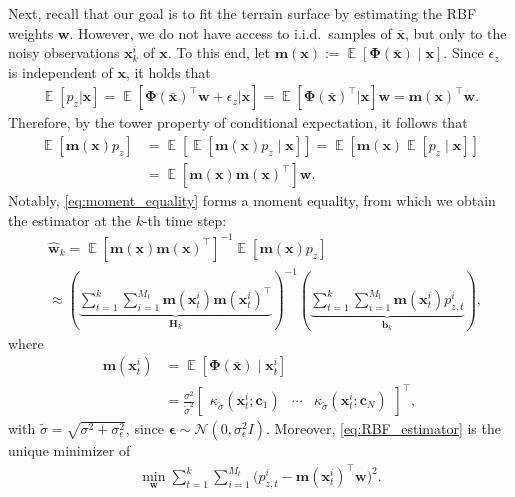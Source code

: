 \documentclass[journal,twoside,web]{ieeecolor}
\DeclareMathOperator*{\mE}{\mathbb{E}}
\begin{document}
Next, recall that our goal is to fit the terrain surface by estimating the RBF weights $\mathbf{w}$. 
However, we do not have access to i.i.d.\ samples of $\bar{\mathbf{x}}$, but only to the noisy observations $\mathbf{x}^i_k$ of $\mathbf{x}$. 
To this end, let $\mathbf{m}(\mathbf{x}):=\mE[\bm\Phi(\bar{\mathbf{x}})\mid\mathbf{x}]$. Since $\epsilon_z$ is independent of $\mathbf{x}$, it holds that
\begin{align}\label{eq:conditional_expectation}
    \mE[p_z|\mathbf{x}]=\mE[\bm\Phi(\mathbf{\bar{x}})^\top\mathbf{w}+\epsilon_z|\mathbf{x}]=\mE[\bm\Phi(\mathbf{\bar{x}})^\top|\mathbf{x}]\mathbf{w}=\mathbf{m}(\mathbf{x})^\top\mathbf{w}.
\end{align}
Therefore, by the tower property of conditional expectation, it follows that
\begin{equation}
\begin{aligned}
    \mE[\mathbf{m}(\mathbf{x})p_z]
    &=\mE\!\left[\mE[\mathbf{m}(\mathbf{x})p_z\mid\mathbf{x}]\right]
    =\mE\!\left[\mathbf{m}(\mathbf{x})\mE[p_z\mid\mathbf{x}]\right]\\
    &=\mE[\mathbf{m}(\mathbf{x})\mathbf{m}(\mathbf{x})^\top]\mathbf{w}.
    \label{eq:moment_equality}
\end{aligned}
\end{equation}
Notably, \eqref{eq:moment_equality} forms a moment equality, from which we obtain the estimator at the $k$-th time step:
\begin{align}
&\hat{\mathbf{w}}_k=\mE[\mathbf{m}(\mathbf{x})\mathbf{m}(\mathbf{x})^\top]^{-1}\mE[\mathbf{m}(\mathbf{x})p_z]\nonumber\\
&\approx (\underbrace{\sum_{t=1}^k\sum_{i=1}^{M_t} \mathbf{m}(\mathbf{x}_t^i)\mathbf{m}(\mathbf{x}_t^i)^\top}_{\mathbf{H}_k})^{-1}
(\underbrace{\sum_{t=1}^k\sum_{i=1}^{M_t}  \mathbf{m}(\mathbf{x}_t^i)p_{z,t}^i}_{\mathbf{b}_k}), \label{eq:RBF_estimator}
\end{align}
where
\begin{align}
    \mathbf{m}(\mathbf{x}_t^i)
    &= \mE[\bm{\Phi}(\bar{\mathbf{x}})\mid\mathbf{x}_t^i]\nonumber\\
    &=\frac{\sigma^2}{\tilde{\sigma}^2}\begin{bmatrix}
        \kappa_{\tilde{\sigma}}(\mathbf{x}_t^i;\mathbf{c}_1) &\cdots & \kappa_{\tilde{\sigma}}(\mathbf{x}_t^i;\mathbf{c}_N)
    \end{bmatrix}^\top,
\end{align}
with $\tilde{\sigma}=\sqrt{\sigma^2+\sigma_\epsilon^2}$, since $\bm\epsilon\sim\mathcal{N}(0,\sigma_\epsilon^2 I)$.
Moreover, \eqref{eq:RBF_estimator} is the unique minimizer of
\begin{align}
    \min_{\mathbf{w}} \sum_{t=1}^k\sum_{i=1}^{M_t}\bigl(p_{z,t}^i-\mathbf{m}(\mathbf{x}_t^i)^\top \mathbf{w}\bigr)^2.
    \label{eq:mm_corresponding_obj_fun}
\end{align}
\end{document}
